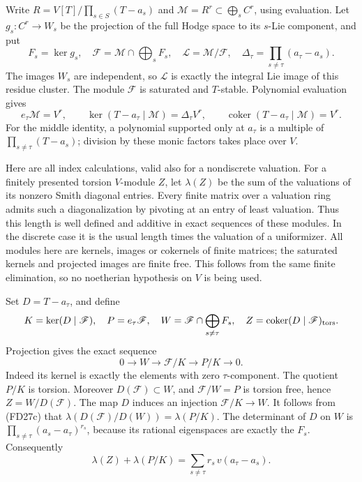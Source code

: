 Write \(R=V[T]/\prod_{s\in S}(T-a_s)\) and
\(\mathscr M=R^r\subset\bigoplus_s C^r\), using evaluation.
Let \(g_s:C^r\to W_s\) be the projection of the full Hodge
space to its \(s\)-Lie component, and put
\[
 F_s=\ker g_s,\quad
 \mathscr F=\mathscr M\cap\bigoplus_sF_s,\quad
 \mathscr L=\mathscr M/\mathscr F,\quad
 \Delta_\tau=\prod_{s\ne\tau}(a_\tau-a_s).
 \tag{FD27a}
\]
The images \(W_s\) are independent, so \(\mathscr L\) is
exactly the integral Lie image of this residue cluster.
The module \(\mathscr F\) is saturated and \(T\)-stable.
Polynomial evaluation gives
\[
 e_\tau\mathscr M=V^r,\qquad
 \ker(T-a_\tau\mid\mathscr M)=\Delta_\tau V^r,\qquad
 \operatorname{coker}(T-a_\tau\mid\mathscr M)=V^r .
 \tag{FD27b}
\]
For the middle identity, a polynomial supported only at
\(a_\tau\) is a multiple of
\(\prod_{s\ne\tau}(T-a_s)\); division by these monic factors
takes place over \(V\).

Here are all index calculations, valid also for a nondiscrete
valuation.  For a finitely presented torsion \(V\)-module
\(Z\), let \(\lambda(Z)\) be the sum of the valuations of its
nonzero Smith diagonal entries.
Every finite matrix over a valuation ring admits such a
diagonalization by pivoting at an entry of least valuation.
Thus this length is well defined and additive in exact
sequences of these modules.  In the discrete case it is the
usual length times the valuation of a uniformizer.
All modules here are kernels, images or cokernels of finite
matrices; the saturated kernels and projected images are
finite free.  This follows from the same finite elimination,
so no noetherian hypothesis on \(V\) is being used.

Set \(D=T-a_\tau\), and define
\[
 K=\ker(D\mid\mathscr F),\quad P=e_\tau\mathscr F,\quad
 W=\mathscr F\cap\bigoplus_{s\ne\tau}F_s,\quad
 Z=\operatorname{coker}(D\mid\mathscr F)_{\rm tors}.
\]
Projection gives the exact sequence
\[
                      0\to W\to\mathscr F/K\to P/K\to0 .
 \tag{FD27c}
\]
Indeed its kernel is exactly the elements with zero
\(\tau\)-component.  The quotient \(P/K\) is torsion.
Moreover \(D(\mathscr F)\subset W\), and
\(\mathscr F/W=P\) is torsion free, hence
\(Z=W/D(\mathscr F)\).
The map \(D\) induces an injection \(\mathscr F/K\to W\).
It follows from (FD27c) that
\(\lambda(D(\mathscr F)/D(W))=\lambda(P/K)\).
The determinant of \(D\) on \(W\) is
\(\prod_{s\ne\tau}(a_s-a_\tau)^{r_s}\), because its
rational eigenspaces are exactly the \(F_s\).
Consequently
\[
        \lambda(Z)+\lambda(P/K)
                  =\sum_{s\ne\tau}r_s\,v(a_\tau-a_s).
 \tag{FD27d}
\]

